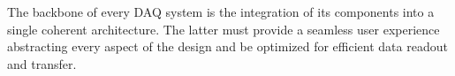 The backbone of every DAQ system is the integration of its components into a single coherent architecture. The latter must provide a seamless user experience abstracting every aspect of the design and be optimized for efficient data readout and transfer. 
